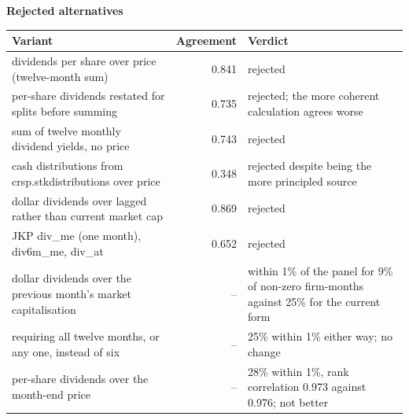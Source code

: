 \documentclass[11pt]{article}
\begin{document}
\textbf{Rejected alternatives}\\[2pt]
{\small\begin{longtable}{@{}p{9.6cm}rp{4.3cm}@{}}
\toprule Variant & Agreement & Verdict\\\midrule\endhead
dividends per share over price (twelve-month sum) & 0.841 & rejected\\
per-share dividends restated for splits before summing & 0.735 & rejected; the more coherent calculation agrees worse\\
sum of twelve monthly dividend yields, no price & 0.743 & rejected\\
cash distributions from crsp.stkdistributions over price & 0.348 & rejected despite being the more principled source\\
dollar dividends over lagged rather than current market cap & 0.869 & rejected\\
JKP div\_me (one month), div6m\_me, div\_at & 0.652 & rejected\\
dollar dividends over the previous month's market capitalisation & -- & within 1\% of the panel for 9\% of non-zero firm-months against 25\% for the current form\\
requiring all twelve months, or any one, instead of six & -- & 25\% within 1\% either way; no change\\
per-share dividends over the month-end price & -- & 28\% within 1\%, rank correlation 0.973 against 0.976; not better\\
\bottomrule\end{longtable}}
\end{document}
